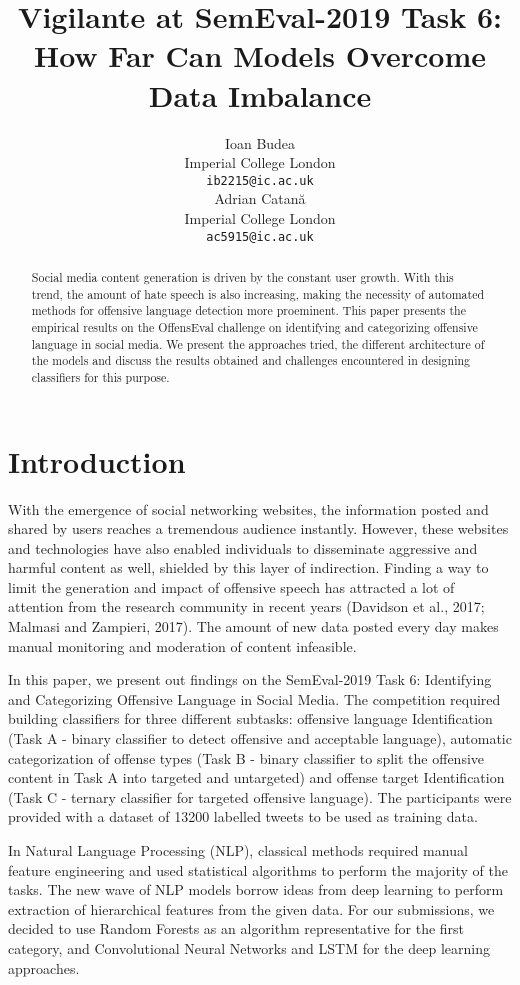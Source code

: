 \documentclass[11pt,a4paper]{article}
\title{Vigilante at SemEval-2019 Task 6:  How Far Can Models Overcome Data Imbalance}
\author{Ioan Budea \\
  Imperial College London \\
  {\tt ib2215@ic.ac.uk} \\\And
  Adrian Catan\u{a} \\
  Imperial College London \\
  {\tt ac5915@ic.ac.uk} \\}
\date{}
\begin{document}
\maketitle
\begin{abstract}
  Social media content generation is driven by the constant user growth. With this trend, the amount of hate speech is also increasing, making the necessity of automated methods for offensive language detection more proeminent.
  This paper presents the empirical results on the OffensEval challenge on identifying and categorizing offensive language in social media. We present the approaches tried, the different architecture of the models and discuss the results obtained and challenges encountered in designing classifiers for this purpose.
\end{abstract}

\section{Introduction}

With the emergence of social networking websites, the information posted and shared by users reaches a tremendous audience instantly. However, these websites and technologies have also enabled individuals to disseminate aggressive and harmful content as well, shielded by this layer of indirection. Finding a way to limit the generation and impact of offensive speech has attracted a lot of attention from the research community in recent years (Davidson et al., 2017; Malmasi and Zampieri, 2017). The amount of new data posted every day makes manual monitoring and moderation of content infeasible.

In this paper, we present out findings on the SemEval-2019 Task 6: Identifying and Categorizing Offensive Language in Social Media. The competition required building classifiers for three different subtasks: offensive language Identification (Task A - binary classifier to detect offensive and acceptable language), automatic categorization of offense types (Task B - binary classifier to split the offensive content in Task A into targeted and untargeted) and offense target Identification (Task C - ternary classifier for targeted offensive language). The participants were provided with a dataset of 13200 labelled tweets to be used as training data.

In Natural Language Processing (NLP), classical methods required manual feature engineering and used statistical algorithms to perform the majority of the tasks. The new wave of NLP models borrow ideas from deep learning to perform extraction of hierarchical features from the given data. For our submissions, we decided to use Random Forests as an algorithm representative for the first category, and Convolutional Neural Networks and LSTM for the deep learning approaches.
\end{document}
